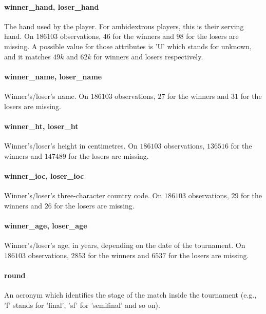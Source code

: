 \documentclass{article}
\begin{document}
\paragraph{winner\_hand, loser\_hand}
The hand used by the player. For ambidextrous players, this is their serving hand. On $186103$ observations, $46$ for the winners and $98$ for the losers are missing. A possible value for those attributes is 'U' which stands for unknown, and it matches $49k$ and $62k$ for winners and losers respectively.

\paragraph{winner\_name, loser\_name}
Winner's/loser's name. On $186103$ observations, $27$ for the winners and $31$ for the losers are missing.

\paragraph{winner\_ht, loser\_ht}
Winner's/loser's height in centimetres. On $186103$ observations, $136516$ for the winners and $147489$ for the losers are missing.

\paragraph{winner\_ioc, loser\_ioc}
Winner's/loser's three-character country code. On $186103$ observations, $29$ for the winners and $26$ for the losers are missing.

\paragraph{winner\_age, loser\_age}
Winner's/loser's age, in years, depending on the date of the tournament. On $186103$ observations, $2853$ for the winners and $6537$ for the losers are missing.

\paragraph{round}
An acronym which identifies the stage of the match inside the tournament (e.g., 'f' stands for 'final', 'sf' for 'semifinal' and so on).
\end{document}
